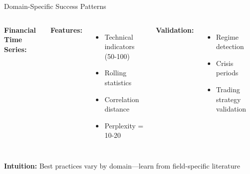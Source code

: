 \documentclass[aspectratio=169]{beamer}
\newcommand{\intuition}[1]{\colorbox{green!10}{\textcolor{intuitioncolor}{\textbf{Intuition:} #1}}}
\begin{document}
\begin{frame}{Domain-Specific Success Patterns}
\begin{columns}
\textbf{Financial Time Series:}

\textbf{Features:}
\begin{itemize}
\item Technical indicators (50-100)
\item Rolling statistics
\item Correlation distance
\item Perplexity = 10-20
\end{itemize}

\textbf{Validation:}
\begin{itemize}
\item Regime detection
\item Crisis periods
\item Trading strategy validation
\end{itemize}
\end{columns}

\vspace{0.3cm}
\intuition{Best practices vary by domain—learn from field-specific literature}
\end{frame}
\end{document}

